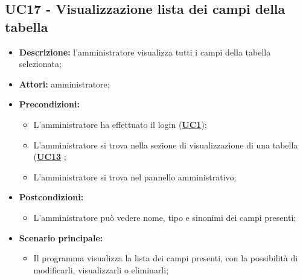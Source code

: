 \subsection{UC17 - Visualizzazione lista dei campi della tabella}
\label{sec:UC17}
\begin{itemize}
	\item \textbf{Descrizione:} l’amministratore visualizza tutti i campi della tabella selezionata;
	\item \textbf{Attori:} amministratore;
	\item \textbf{Precondizioni:} 
	\begin{itemize}
		\item L’amministratore ha effettuato il login (\hyperref[sec:UC1]{\textbf{UC1}});
		\item L’amministratore si trova nella sezione di visualizzazione di una tabella (\hyperref[sec:UC13]{\textbf{UC13}} ;
		\item L’amministratore si trova nel pannello amministrativo;
	\end{itemize}
	\item \textbf{Postcondizioni:} 
	\begin{itemize}
		\item L'amministratore può vedere nome, tipo e sinonimi dei campi presenti;
	\end{itemize}
	\item \textbf{Scenario principale:} 
	\begin{itemize}
		\item Il programma visualizza la lista dei campi presenti, con la possibilità di modificarli, visualizzarli o eliminarli;
	\end{itemize}
\end{itemize}

